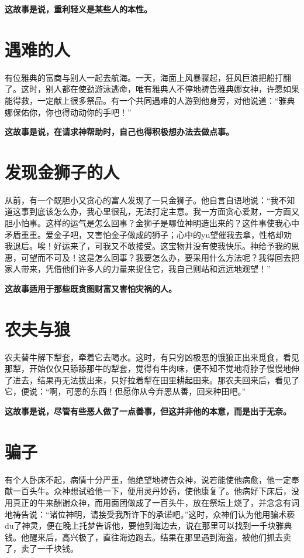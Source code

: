 {\bfseries \color{red}这故事是说，重利轻义是某些人的本性。}

\section{遇难的人}

有位雅典的富商与别人一起去航海。一天，海面上风暴骤起，狂风巨浪把船打翻了。这时，别人都在使劲游泳逃命，唯有雅典人不停地祷告雅典娜女神，许愿如果能得救，一定献上很多祭品。有一个共同遇难的人游到他身旁，对他说道：“雅典娜保佑你，你也得动动你的手吧！”

{\bfseries \color{red}这故事是说，在请求神帮助时，自己也得积极想办法去做点事。}

\section{发现金狮子的人}

从前，有一个既胆小又贪心的富人发现了一只金狮子。他自言自语地说：“我不知道这事到底该怎么办，我心里很乱，无法打定主意。我一方面贪心爱财，一方面又胆小怕事。这样的运气是怎么回事？金狮子是哪位神明造出来的？这件事使我心中矛盾重重。爱金子吧，又害怕金子做成的狮子；心中的yu望催我去拿，性格却劝我退后。唉！好运来了，可我又不敢接受。这宝物并没有使我快乐。神给予我的恩惠，可望而不可及！这是怎么回事？我要怎么办，要采用什么方法呢？我得回去把家人带来，凭借他们许多人的力量来捉住它，我自己则站和远远地观望！”

{\bfseries \color{red}这故事适用于那些既贪图财富又害怕灾祸的人。}

\section{农夫与狼}

农夫替牛解下犁套，牵着它去喝水。这时，有只穷凶极恶的饿狼正出来觅食，看见那犁，开始仅仅只舔舔那牛的犁套，觉得有牛肉味，便不知不觉地将脖子慢慢地伸了进去，结果再无法拔出来，只好拉着犁在田里耕起田来。那农夫回来后，看见了它，便说：“啊，可恶的东西！但愿你从今弃恶从善，回来种田吧。”

{\bfseries \color{red}这故事是说，尽管有些恶人做了一点善事，但这并非他的本意，而是出于无奈。}

\section{骗子}

有个人卧床不起，病情十分严重，他绝望地祷告众神，说若能使他病愈，他一定奉献一百头牛。众神想试验他一下，便用灵丹妙药，使他康复了。他病好下床后，没用真正的牛来酬谢众神，而用面团做成了一百头牛，放在祭坛上烧了，并念念有词地祷告说：“诸位神明，请接受我所许下的承诺吧。”这时，众神们认为他用骗术亵du了神灵，便在晚上托梦告诉他，要他到海边去，说在那里可以找到一千块雅典钱。他醒来后，高兴极了，直往海边跑去。结果在那里遇到海盗，被他们抓去卖了，卖了一千块钱。

